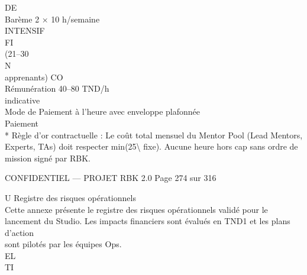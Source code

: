 DE\\
Barème           2 × 10 h/semaine\\
INTENSIF\\
\vspace{0.5em}
\vspace{0.5em}
\vspace{0.5em}
\vspace{0.5em}
FI\\
(21–30\\
\vspace{0.5em}
\vspace{0.5em}
\vspace{0.5em}
N\\
apprenants)            CO\\
Rémunération 40–80 TND/h\\
indicative\\
\vspace{0.5em}
Mode de            Paiement à l’heure avec enveloppe plafonnée\\
Paiement\\
* Règle d’or contractuelle : Le coût total mensuel du Mentor Pool (Lead Mentors, Experts, TAs) doit respecter min(25\textbackslash{}%
fixe). Aucune heure hors cap sans ordre de mission signé par RBK.\\
\vspace{0.5em}
\vspace{0.5em}
\vspace{0.5em}
\vspace{0.5em}
\begin{confidential}CONFIDENTIEL — PROJET RBK 2.0                                     Page 274 sur 316\end{confidential}
U \textbar{} Registre des risques opérationnels\\
\vspace{0.5em}
\vspace{0.5em}
Cette annexe présente le registre des risques opérationnels validé pour le lancement du Studio. Les impacts financiers sont évalués en TND1 et les plans d’action\\
sont pilotés par les équipes Ops.\\
\vspace{0.5em}
\vspace{0.5em}
\vspace{0.5em}
\vspace{0.5em}
EL\\
TI\\
